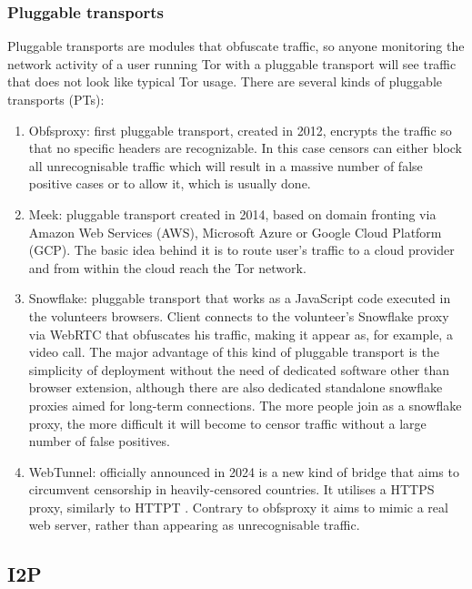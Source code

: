 \subsubsection{Pluggable transports}
Pluggable transports are modules that obfuscate traffic, so anyone monitoring the network activity of a user running Tor with a pluggable transport will see traffic that does not look like typical Tor usage. There are several kinds of pluggable transports (PTs):
\begin{enumerate}
    \item Obfsproxy: first pluggable transport, created in 2012, encrypts the traffic so that no specific headers are recognizable. In this case censors can either block all unrecognisable traffic which will result in a massive number of false positive cases or to allow it, which is usually done.
    \item Meek: pluggable transport created in 2014, based on domain fronting via Amazon Web Services (AWS), Microsoft Azure or Google Cloud Platform (GCP). The basic idea behind it is to route user’s traffic to a cloud provider and from within the cloud reach the Tor network.
    \item Snowflake: pluggable transport that works as a JavaScript code executed in the volunteers browsers. Client connects to the volunteer’s Snowflake proxy via WebRTC that obfuscates his traffic, making it appear as, for example, a video call. The major advantage of this kind of pluggable transport is the simplicity of deployment without the need of dedicated software other than browser extension, although there are also dedicated standalone snowflake proxies aimed for long-term connections. The more people join as a snowflake proxy, the more difficult it will become to censor traffic without a large number of false positives.
    \item WebTunnel: officially announced in 2024 is a new kind of bridge that aims to circumvent censorship in heavily-censored countries. It utilises a HTTPS proxy, similarly to HTTPT \cite{httpt}. Contrary to obfsproxy it aims to mimic a real web server, rather than appearing as unrecognisable traffic.
\end{enumerate}

\subsection{I2P}

